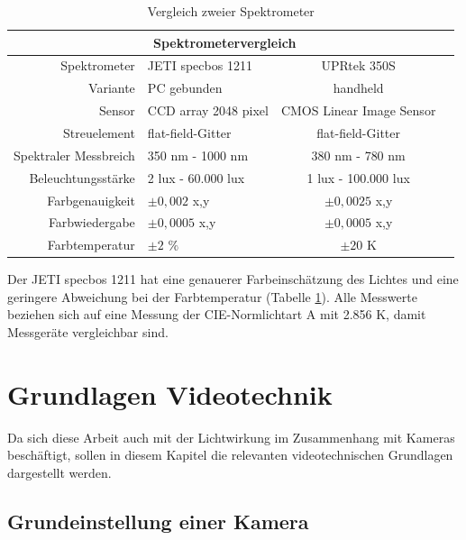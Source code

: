 \begin{table}[htp] 
		\centering
		\begin{tabular}{rlcc}  %
		\toprule
		\multicolumn{3}{c}{\large\sffamily Spektrometervergleich}\\ 							
		\midrule
		Spektrometer & JETI specbos 1211 & UPRtek 350S\\
		Variante & PC gebunden & handheld\\
		Sensor & CCD array 2048 pixel & CMOS Linear Image Sensor\\
		Streuelement & flat-field-Gitter & flat-field-Gitter\\
		Spektraler Messbreich & 350 nm - 1000 nm & 380 nm - 780 nm\\
		Beleuchtungsstärke & 2 lux - 60.000 lux & 1 lux - 100.000 lux\\
		Farbgenauigkeit &  $\pm 0,002$ x,y & $\pm 0,0025$ x,y\\
		Farbwiedergabe &  $\pm 0,0005$ x,y & $\pm 0,0005$ x,y\\		
		Farbtemperatur &  $\pm 2$ $\%$ & $\pm 20$ K\\
		\bottomrule
		\end{tabular}
		\caption{Vergleich zweier Spektrometer\protect\footnotemark}	
		\label{t_spek}
	\end{table}

Der JETI specbos 1211 hat eine genauerer Farbeinschätzung des Lichtes und eine geringere Abweichung bei der Farbtemperatur (Tabelle \ref{t_spek}). Alle Messwerte beziehen sich auf eine Messung der CIE-Normlichtart A mit 2.856 K, damit Messgeräte vergleichbar sind.




\chapter{Grundlagen Videotechnik}
Da sich diese Arbeit auch mit der Lichtwirkung im Zusammenhang mit Kameras beschäftigt, sollen in diesem Kapitel die relevanten videotechnischen Grundlagen dargestellt werden.

\section{Grundeinstellung einer Kamera}

